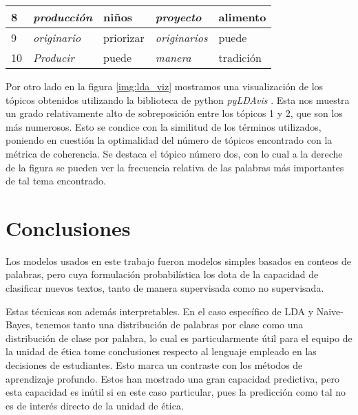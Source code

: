 \documentclass[
	spanish, %
	letterpaper, oneside
]{article}
\begin{document}
\begin{table}[htbp]
\begin{tabular}{l|llll|}
        \multicolumn{1}{|l|}{8}                            & \multicolumn{1}{l|}{\textit{producción}}        & \multicolumn{1}{l|}{niños}                      & \multicolumn{1}{l|}{\textit{proyecto}}          & alimento                  \\ \hline
        \multicolumn{1}{|l|}{9}                            & \multicolumn{1}{l|}{\textit{originario}}        & \multicolumn{1}{l|}{priorizar}                  & \multicolumn{1}{l|}{\textit{originarios}}       & puede                     \\ \hline
        \multicolumn{1}{|l|}{10}                           & \multicolumn{1}{l|}{\textit{Producir}}          & \multicolumn{1}{l|}{puede}                      & \multicolumn{1}{l|}{\textit{manera}}            & tradición                 \\ \hline
        \end{tabular}
    \label{tab:topicos}
\end{table}

Por otro lado en la figura \ref{img:lda_viz} mostramos una visualización de los tópicos obtenidos utilizando la biblioteca de python \textit{pyLDAvis} \cite{viz}. Esta nos muestra un grado relativamente alto de sobreposición entre los tópicos 1 y 2, que son los más numerosos. Esto se condice con la similitud de los términos utilizados, poniendo en cuestión la optimalidad del número de tópicos encontrado con la métrica de coherencia. Se destaca el tópico número dos, con lo cual a la dereche de la figura se pueden ver la frecuencia relativa de las palabras más importantes de tal tema encontrado.



\section{Conclusiones}

Los modelos usados en este trabajo fueron modelos simples basados en conteos de palabras, pero cuya formulación probabilística los dota de la capacidad de clasificar nuevos textos, tanto de manera supervisada como no supervisada. 

\newp Estas técnicas son además interpretables. En el caso específico de LDA y Naive-Bayes, tenemos tanto una distribución de palabras por clase como una distribución de clase por palabra, lo cual es particularmente útil para el equipo de la unidad de ética tome conclusiones respecto al lenguaje empleado en las decisiones de estudiantes. Esto marca un contraste con los métodos de aprendizaje profundo. Estos han mostrado una gran capacidad predictiva, pero esta capacidad es inútil si en este caso particular, pues la predicción como tal no es de interés directo de la unidad de ética.
\end{document}
